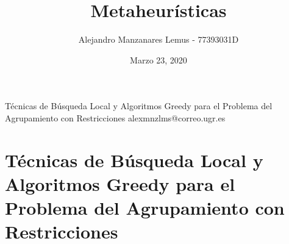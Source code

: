 \documentclass[10pt]{report}
\author{Alejandro Manzanares Lemus - 77393031D}
\title{Metaheurísticas}
\date{Marzo 23, 2020}
\begin{document}
            {Técnicas de Búsqueda Local y Algoritmos Greedy para el Problema del Agrupamiento con Restricciones}
            {alexmnzlms@correo.ugr.es}

\tableofcontents


\chapter{Técnicas de Búsqueda Local y Algoritmos Greedy para el Problema del Agrupamiento con Restricciones}




\end{document}
